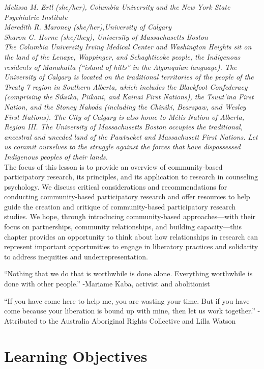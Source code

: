 \documentclass[
  11pt,
]{book}
\begin{document}
\emph{Melissa M. Ertl (she/her), Columbia University and the New York State Psychiatric Institute}\\
\emph{Meredith R. Maroney (she/her),University of Calgary}\\
\emph{Sharon G. Horne (she/they), University of Massachusetts Boston}\\
\emph{The Columbia University Irving Medical Center and Washington Heights sit on the land of the Lenape, Wappinger, and Schaghticoke people, the Indigenous residents of Manahatta (``island of hills'' in the Algonquian language). The University of Calgary is located on the traditional territories of the people of the Treaty 7 region in Southern Alberta, which includes the Blackfoot Confederacy (comprising the Siksika, Piikani, and Kainai First Nations), the Tsuut'ina First Nation, and the Stoney Nakoda (including the Chiniki, Bearspaw, and Wesley First Nations). The City of Calgary is also home to Métis Nation of Alberta, Region III. The University of Massachusetts Boston occupies the traditional, ancestral and unceded land of the Pawtucket and Massachusett First Nations. Let us commit ourselves to the struggle against the forces that have dispossessed Indigenous peoples of their lands.}\\

The focus of this lesson is to provide an overview of community-based participatory research, its principles, and its application to research in counseling psychology. We discuss critical considerations and recommendations for conducting community-based participatory research and offer resources to help guide the creation and critique of community-based participatory research studies. We hope, through introducing community-based approaches---with their focus on partnerships, community relationships, and building capacity---this chapter provides an opportunity to think about how relationships in research can represent important opportunities to engage in liberatory practices and solidarity to address inequities and underrepresentation.

``Nothing that we do that is worthwhile is done alone. Everything worthwhile is done with other people.'' -Mariame Kaba, activist and abolitionist

``If you have come here to help me, you are wasting your time. But if you have come because your liberation is bound up with mine, then let us work together.'' -Attributed to the Australia Aboriginal Rights Collective and Lilla Watson

\hypertarget{learning-objectives-2}{%
\section{Learning Objectives}\label{learning-objectives-2}}
\end{document}
